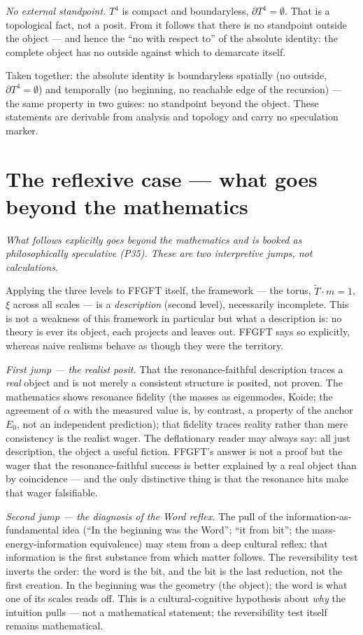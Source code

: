 \emph{No external standpoint.} $T^4$ is compact and boundaryless,
$\partial T^4 = \emptyset$. That is a topological fact, not a posit. From it
follows that there is no standpoint outside the object --- and hence the \enquote{no
with respect to} of the absolute identity: the complete object has no outside
against which to demarcate itself.

Taken together: the absolute identity is boundaryless spatially (no outside,
$\partial T^4=\emptyset$) and temporally (no beginning, no reachable edge of the
recursion) --- the same property in two guises: no standpoint beyond the object.
These statements are derivable from analysis and topology and carry no speculation
marker.

\section{The reflexive case --- what goes beyond the mathematics}

\emph{What follows explicitly goes beyond the mathematics and is booked as
philosophically speculative (P35). These are two interpretive jumps, not
calculations.}

Applying the three levels to FFGFT itself, the framework --- the torus,
$\tilde{T}\cdot m=1$, $\xi$ across all scales --- is a \emph{description} (second
level), necessarily incomplete. This is not a weakness of this framework in
particular but what a description is: no theory is ever its object, each projects
and leaves out. FFGFT says so explicitly, whereas naive realisms behave as though
they were the territory.

\emph{First jump --- the realist posit.} That the resonance-faithful description
traces a \emph{real} object and is not merely a consistent structure is posited,
not proven. The mathematics shows resonance fidelity (the masses as eigenmodes,
Koide; the agreement of $\alpha$ with the measured value is, by contrast, a
property of the anchor $E_0$, not an independent prediction); that fidelity traces reality rather than
mere consistency is the realist wager. The deflationary reader may always say: all
just description, the object a useful fiction. FFGFT's answer is not a proof but the
wager that the resonance-faithful success is better explained by a real object than
by coincidence --- and the only distinctive thing is that the resonance hits make
that wager falsifiable.

\emph{Second jump --- the diagnosis of the Word reflex.} The pull of the
information-as-fundamental idea (\enquote{In the beginning was the Word};
\enquote{it from bit}; the mass-energy-information equivalence) may stem from a deep
cultural reflex: that information is the first substance from which matter follows.
The reversibility test inverts the order: the word is the bit, and the bit is the
last reduction, not the first creation. In the beginning was the geometry (the
object); the word is what one of its scales reads off. This is a cultural-cognitive
hypothesis about \emph{why} the intuition pulls --- not a mathematical statement; the
reversibility test itself remains mathematical.

